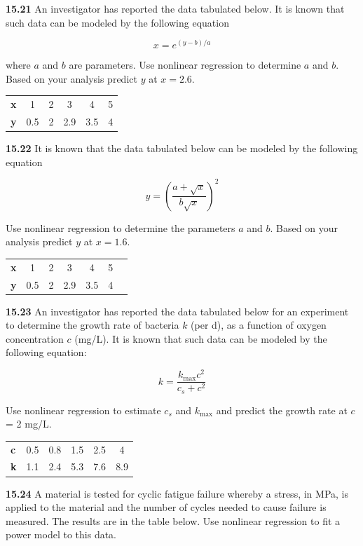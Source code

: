 \documentclass[../main.tex]{subfiles}
\begin{document}
\begin{multicols}{2}
	\noindent\textbf{15.21} An investigator has reported the data tabulated below.
	It is known that such data can be modeled by the following
   equation

   $$
	x = e^{(y-b) / a}
   $$

   \noindent where $a$ and $b$ are parameters. Use nonlinear regression to
   determine $a$ and $b$. Based on your analysis predict $y$ at $x = 2.6$.

   \noindent
   \begin{tabular}{l c c c c c }
	\textbf{x} &	1 &	2 &	3 &	4 &	5 \\
	\textbf{y} &	0.5 &	2 &	2.9 &	3.5 &	4
   \end{tabular}

   \noindent\textbf{15.22} It is known that the data tabulated below can be modeled by the following equation

   $$
 	y = ( \frac{a + \sqrt{x}}{b \sqrt{x}})^2  
   $$

   \noindent Use nonlinear regression to determine the parameters $a$ and $b$.
   Based on your analysis predict $y$ at $x = 1.6$.

   \noindent 
   \begin{tabular}{l c c c c c c}
	\textbf{x} &	1 &	2 &	3 &	4 &	5 \\
	\textbf{y} &	0.5 &	2 &	2.9 &	3.5 &	4
   \end{tabular}

   \noindent\textbf{15.23}  An investigator has reported the data tabulated below
   for an experiment to determine the growth rate of bacteria $k$
   (per d), as a function of oxygen concentration $c$ (mg/L). It is
   known that such data can be modeled by the following
   equation:

   $$
 	k = \frac{k_{\text{max}} c^2}{c_s + c^2}  
   $$

   \noindent Use nonlinear regression to estimate $c_s$ and $k_{\text{max}}$ and predict
   the growth rate at $c$ = 2 mg/L.
   
   \begin{tabular}{l c c c c c}
		\textbf{c} &	0.5 &	0.8 &	1.5 &	2.5 &	4 \\
		\textbf{k} &	1.1 &	2.4 &	5.3 &	7.6 &	8.9
   \end{tabular}

   \noindent\textbf{15.24} A material is tested for cyclic fatigue failure whereby
   a stress, in MPa, is applied to the material and the number of
   cycles needed to cause failure is measured. The results are in
   the table below. Use nonlinear regression to fit a power
	model to this data.


\end{multicols}
\end{document}
